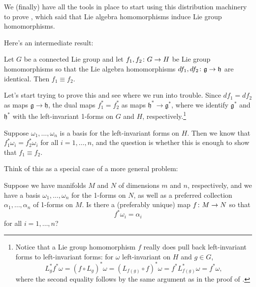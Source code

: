 We (finally) have all the tools in place to start using this distribution machinery to prove , which said that Lie algebra homomorphisms induce Lie group homomorphisms.

Here's an intermediate result:

\begin{theorem}\label{thm:identical Lie algebra homomorphisms imply identical Lie group homomorphisms}
	Let $G$ be a connected Lie group and let $f_1, f_2 \colon\thinspace\! G \to H$ be Lie group homomorphisms so that the Lie algebra homomorphisms $df_1, df_2 \colon\thinspace\! \mathfrak{g} \to \mathfrak{h}$ are identical. Then $f_1 \equiv f_2$.
\end{theorem}


Let's start trying to prove this and see where we run into trouble. Since $df_1 = df_2$ as maps $\mathfrak{g} \to \mathfrak{h}$, the dual maps $f_1^\ast = f_2^ \ast$ as maps $\mathfrak{h}^\ast \to \mathfrak{g}^\ast$, where we identify $\mathfrak{g}^\ast$ and $\mathfrak{h}^\ast$ with the left-invariant 1-forms on $G$ and $H$, respectively.\footnote{Notice that a Lie group homomorphism $f$ really does pull back left-invariant forms to left-invariant forms: for $\omega$ left-invariant on $H$ and $g \in G$,
\[
	L_g^\ast f^\ast \omega = (f \circ L_g)^\ast \omega = (L_{f(g)} \circ f)^\ast \omega = f^\ast L_{f(g)}^\ast \omega = f^\ast \omega,
\]
where the second equality follows by the same argument as in the proof of .}
	
Suppose $\omega_1 , \dots, \omega_n$ is a basis for the left-invariant forms on $H$. Then we know that $f_1^\ast \omega_i = f_2^\ast \omega_i$ for all $i = 1, \dots , n$, and the question is whether this is enough to show that $f_1 \equiv f_2$.
	
Think of this as a special case of a more general problem: 
\begin{problem}\label{prob:map with specified forms}
	Suppose we have manifolds $M$ and $N$ of dimensions $m$ and $n$, respectively, and we have a basis $\omega_1, \dots , \omega_n$ for the 1-forms on $N$, as well as a preferred collection $\alpha_1, \dots , \alpha_n$ of 1-forms on $M$. Is there a (preferably unique) map $f \colon\thinspace\! M \to N$ so that 
	\[
		f^\ast \omega_i = \alpha_i
	\]
	for all $i = 1, \dots , n$?
\end{problem}


